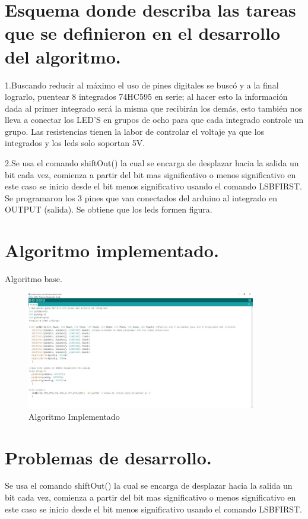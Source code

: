 \documentclass{article}
\begin{document}
\section{Esquema donde describa las tareas que se definieron en el desarrollo del algoritmo.}\label{intro}

1.Buscando reducir al máximo el uso de pines digitales se buscó y a la final lograrlo, puentear 8 integrados 74HC595 en serie; al hacer esto la información dada al primer integrado será la misma que recibirán los demás, esto también nos lleva a conectar los LED’S en grupos de ocho para que cada integrado controle un grupo. Las resistencias tienen la labor de controlar el voltaje ya que los integrados y los leds solo soportan 5V.

2.Se usa el comando shiftOut() la cual se encarga de desplazar hacia la salida un bit cada vez, comienza a partir del bit mas significativo o menos significativo en este caso se inicio desde el bit  menos significativo usando el comando LSBFIRST.
Se programaron los 3 pines que van conectados del arduino al integrado en OUTPUT (salida).
Se obtiene que los leds formen figura.



\newpage
\section{Algoritmo implementado.}\label{intro}
Algoritmo base.
\begin{figure}[h]
\includegraphics[width=10cm]{Algoritmo.jpeg}
\centering
\caption{Algoritmo Implementado}
\label{fig:Algoritmo}
\end{figure}



\section{Problemas de desarrollo.}\label{intro}
Se usa el comando shiftOut() la cual se encarga de desplazar hacia la salida un bit cada vez, comienza a partir del bit mas significativo o menos significativo en este caso se inicio desde el bit  menos significativo usando el comando LSBFIRST.
\end{document}
